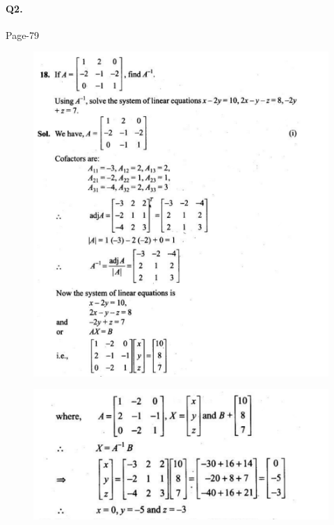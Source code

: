 \documentclass{article}
\begin{document}
\paragraph{Q2.}
\begin{flushright}
Page-79
\end{flushright}
\begin{figure}[H]
    \includegraphics[scale=0.5]{determinants_l4_ps_11.png}
\end{figure}
\begin{figure}[H]
    \includegraphics[scale=0.5]{determinants_l4_ps_12.png}
\end{figure}
\end{document}
